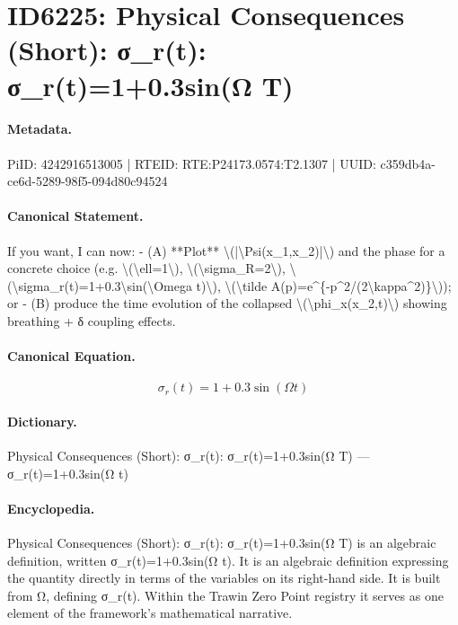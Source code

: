 \section*{ID6225: Physical Consequences (Short): σ\_r(t): σ\_r(t)=1+0.3sin(Ω T)}
\paragraph{Metadata.}
PiID: 4242916513005 | RTEID: RTE:P24173.0574:T2.1307 | UUID: c359db4a-ce6d-5289-98f5-094d80c94524

\paragraph{Canonical Statement.}
If you want, I can now: - (A) **Plot** \textbackslash{}(|\textbackslash{}Psi(x\_1,x\_2)|\textbackslash{}) and the phase for a concrete choice (e.g. \textbackslash{}(\textbackslash{}ell=1\textbackslash{}), \textbackslash{}(\textbackslash{}sigma\_R=2\textbackslash{}), \textbackslash{}(\textbackslash{}sigma\_r(t)=1+0.3\textbackslash{}sin(\textbackslash{}Omega t)\textbackslash{}), \textbackslash{}(\textbackslash{}tilde A(p)=e\textasciicircum{}\{-p\textasciicircum{}2/(2\textbackslash{}kappa\textasciicircum{}2)\}\textbackslash{})); or - (B) produce the time evolution of the collapsed \textbackslash{}(\textbackslash{}phi\_x(x\_2,t)\textbackslash{}) showing breathing + δ coupling effects.

\paragraph{Canonical Equation.}
\[
\sigma_r(t)=1+0.3\sin(\Omega t)
\]

\paragraph{Dictionary.}
Physical Consequences (Short): σ\_r(t): σ\_r(t)=1+0.3sin(Ω T) — σ\_r(t)=1+0.3sin(Ω t)

\paragraph{Encyclopedia.}
Physical Consequences (Short): σ\_r(t): σ\_r(t)=1+0.3sin(Ω T) is an algebraic definition, written σ\_r(t)=1+0.3sin(Ω t). It is an algebraic definition expressing the quantity directly in terms of the variables on its right-hand side. It is built from Ω, defining σ\_r(t). Within the Trawin Zero Point registry it serves as one element of the framework's mathematical narrative.
